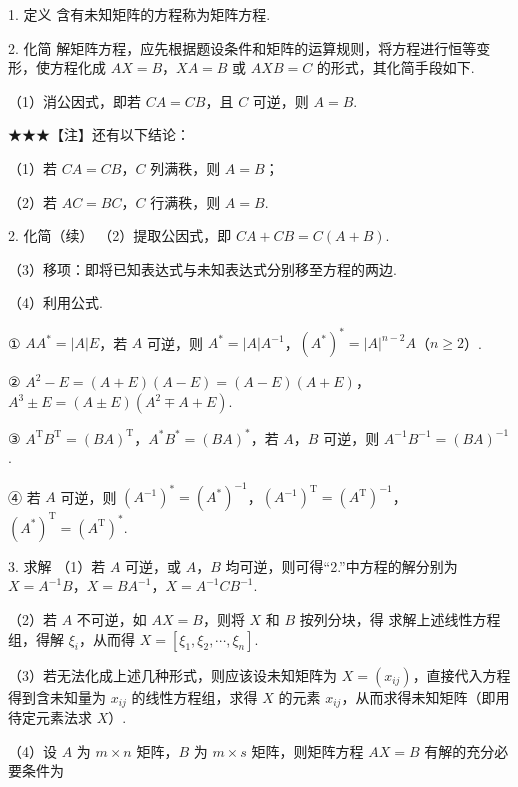 
\begin{fcard}{1. 定义}
含有未知矩阵的方程称为矩阵方程.
\end{fcard}

\begin{fcard}{2. 化简}
解矩阵方程，应先根据题设条件和矩阵的运算规则，将方程进行恒等变形，使方程化成 $AX=B$，$XA=B$ 或 $AXB=C$ 的形式，其化简手段如下.

（1）消公因式，即若 $CA=CB$，且 $C$ 可逆，则 $A=B$.
\end{fcard}

\begin{fnote}
★★★【注】还有以下结论：

（1）若 $CA=CB$，$C$ 列满秩，则 $A=B$；

（2）若 $AC=BC$，$C$ 行满秩，则 $A=B$.
\end{fnote}

\begin{fcard}{2. 化简（续）}
（2）提取公因式，即 $CA+CB=C(A+B)$.

（3）移项：即将已知表达式与未知表达式分别移至方程的两边.

（4）利用公式.

① $AA^{*}=|A|E$，若 $A$ 可逆，则 $A^{*}=|A|A^{-1}$，$(A^{*})^{*}=|A|^{n-2}A$（$n\geqslant2$）.

② $A^{2}-E=(A+E)(A-E)=(A-E)(A+E)$，$A^{3}\pm E=(A\pm E)(A^{2}\mp A+E)$.

③ $A^{\mathrm{T}}B^{\mathrm{T}}=(BA)^{\mathrm{T}}$，$A^{*}B^{*}=(BA)^{*}$，若 $A$，$B$ 可逆，则 $A^{-1}B^{-1}=(BA)^{-1}$.

④ 若 $A$ 可逆，则 $(A^{-1})^{*}=(A^{*})^{-1}$，$(A^{-1})^{\mathrm{T}}=(A^{\mathrm{T}})^{-1}$，$(A^{*})^{\mathrm{T}}=(A^{\mathrm{T}})^{*}$.
\end{fcard}

\begin{fcard}{3. 求解}
（1）若 $A$ 可逆，或 $A$，$B$ 均可逆，则可得“2.”中方程的解分别为 $X=A^{-1}B$，$X=BA^{-1}$，$X=A^{-1}CB^{-1}$.

（2）若 $A$ 不可逆，如 $AX=B$，则将 $X$ 和 $B$ 按列分块，得
求解上述线性方程组，得解 $\xi_i$，从而得 $X=[\xi_1,\xi_2,\cdots,\xi_n]$.

（3）若无法化成上述几种形式，则应该设未知矩阵为 $X=(x_{ij})$，直接代入方程得到含未知量为 $x_{ij}$ 的线性方程组，求得 $X$ 的元素 $x_{ij}$，从而求得未知矩阵（即用待定元素法求 $X$）.

（4）设 $A$ 为 $m\times n$ 矩阵，$B$ 为 $m\times s$ 矩阵，则矩阵方程 $AX=B$ 有解的充分必要条件为
\end{fcard}


